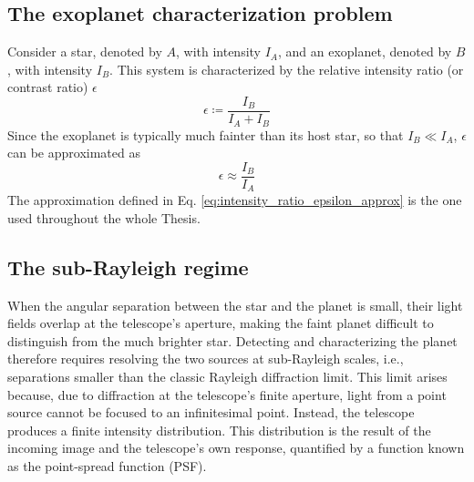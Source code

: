 \subsection{The exoplanet characterization problem}
Consider a star, denoted by $A$, with intensity $I_A$, and an exoplanet, denoted by $B$, with intensity $I_B$. This system is characterized by the relative intensity ratio (or contrast ratio) $\epsilon$
\begin{equation}
    \epsilon \coloneqq \frac{I_B}{I_A+I_B}
    \label{eq:intensity_ratio_epsilon}
\end{equation}
Since the exoplanet is typically much fainter than its host star, so that $I_B \ll I_A$, $\epsilon$ can be approximated as ~\cite{Santamaria2024single}
\begin{equation}
    \epsilon \approx \frac{I_B}{I_A}
    \label{eq:intensity_ratio_epsilon_approx}
\end{equation}
The approximation defined in Eq. \ref{eq:intensity_ratio_epsilon_approx} is the one used throughout the whole Thesis.

\subsection{The sub-Rayleigh regime}
When the angular separation between the star and the planet is small, their light fields overlap at the telescope's aperture, making the faint planet difficult to distinguish from the much brighter star. Detecting and characterizing the planet therefore requires resolving the two sources at sub-Rayleigh scales, i.e., separations smaller than the classic Rayleigh diffraction limit.
This limit arises because, due to diffraction at the telescope's finite aperture, light from a point source cannot be focused to an infinitesimal point. Instead, the telescope produces a finite intensity distribution.
This distribution is the result of the incoming image and the telescope's own response, quantified by a function known as the point-spread function (PSF).

